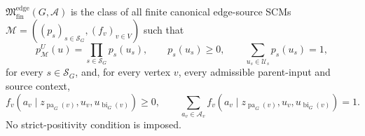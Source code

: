 \(\mathfrak M_{\mathrm{fin}}^{\mathrm{edge}}(G,\mathcal A)\) is the class of all finite canonical edge-source SCMs \(\mathcal M=((p_s)_{s\in\mathcal S_G},(f_v)_{v\in V})\) such that
\[
p_{\mathcal M}^{U}(u)=\prod_{s\in\mathcal S_G}p_s(u_s),\qquad
p_s(u_s)\geq0,\qquad
\sum_{u_s\in\mathcal U_s}p_s(u_s)=1,
\]
for every \(s\in\mathcal S_G\), and, for every vertex \(v\), every admissible parent-input and source context,
\[
f_v(a_v\mid z_{\operatorname{pa}_G(v)},u_v,u_{\operatorname{bi}_G(v)})\geq0,
\qquad
\sum_{a_v\in\mathcal A_v}f_v(a_v\mid z_{\operatorname{pa}_G(v)},u_v,u_{\operatorname{bi}_G(v)})=1.
\]
No strict-positivity condition is imposed.